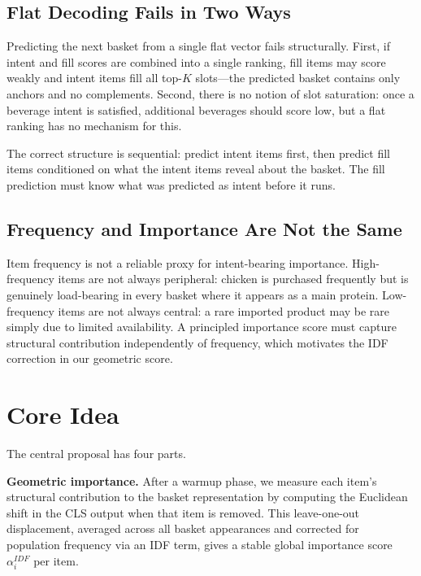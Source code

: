 \documentclass[conference]{IEEEtran}
\begin{document}
\subsection{Flat Decoding Fails in Two Ways}

Predicting the next basket from a single flat vector fails
structurally. First, if intent and fill scores are combined into a
single ranking, fill items may score weakly and intent items fill all
top-$K$ slots---the predicted basket contains only anchors and no
complements. Second, there is no notion of slot saturation: once a
beverage intent is satisfied, additional beverages should score low,
but a flat ranking has no mechanism for this.

The correct structure is sequential: predict intent items first, then
predict fill items conditioned on what the intent items reveal about the
basket. The fill prediction must know what was predicted as intent
before it runs.

\subsection{Frequency and Importance Are Not the Same}

Item frequency is not a reliable proxy for intent-bearing importance.
High-frequency items are not always peripheral: chicken is purchased
frequently but is genuinely load-bearing in every basket where it
appears as a main protein. Low-frequency items are not always central:
a rare imported product may be rare simply due to limited availability.
A principled importance score must capture structural contribution
independently of frequency, which motivates the IDF correction in our
geometric score.


\section{Core Idea}
\label{sec:idea}

The central proposal has four parts.

\textbf{Geometric importance.} After a warmup phase, we measure each
item's structural contribution to the basket representation by computing
the Euclidean shift in the CLS output when that item is removed. This
leave-one-out displacement, averaged across all basket appearances and
corrected for population frequency via an IDF term, gives a stable
global importance score $\alpha_i^{IDF}$ per item.
\end{document}
